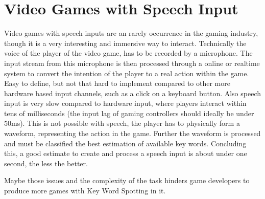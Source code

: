 
\section{Video Games with Speech Input}
Video games with speech inputs are an rarely occurrence in the gaming industry, though it is a very interesting and immersive way to interact.
Technically the voice of the player of the video game, has to be recorded by a microphone.
The input stream from this microphone is then processed through a online or realtime system to convert the intention of the player to a real action within the game.
Easy to define, but not that hard to implement compared to other more hardware based input channels, such as a click on a keyboard button.
Also speech input is very slow compared to hardware input, where players interact within tens of milliseconds (the input lag of gaming controllers should ideally be under 50ms).
This is not possible with speech, the player has to physically form a waveform, representing the action in the game.
Further the waveform is processed and must be classified the best estimation of available key words.
Concluding this, a good estimate to create and process a speech input is about under one second, the less the better.

Maybe those issues and the complexity of the task hinders game developers to produce more games with Key Word Spotting in it.


